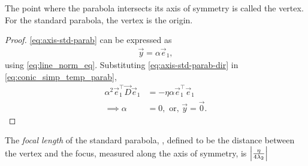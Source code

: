 	\begin{corollary}
			\label{corr:center-parab}
 The point where the parabola intersects its axis of symmetry is called the vertex. For the standard parabola, the vertex is the origin.
	\end{corollary}
	\begin{proof}
					\eqref{eq:axis-std-parab} can be expressed as 
    \begin{align}
			\vec{y}= \alpha \vec{e}_1 
					\label{eq:axis-std-parab-dir}, 
    \end{align}
    using 
    \eqref{eq:line_norm_eq}.
					Substituting \eqref{eq:axis-std-parab-dir} in 
    \eqref{eq:conic_simp_temp_parab}, 
    \begin{align}
	     \alpha^2 \vec{e}_1^{\top}\vec{D} \vec{e}_1 &=  -\eta\alpha \vec{e}_1^{\top} \vec{e}_1   
	     \\
	     \implies \alpha &=0, \text{ or, } \vec{y} = \vec{0}.
    \end{align}
	\end{proof}
	\begin{corollary}
			\label{corr:foclen}
	 The {\em focal length} of the standard parabola, , defined to be the distance between the vertex and the focus, measured along the axis of symmetry, is $\left\vert\frac{\eta}{4 \lambda_2}\right\vert$
	\end{corollary}
